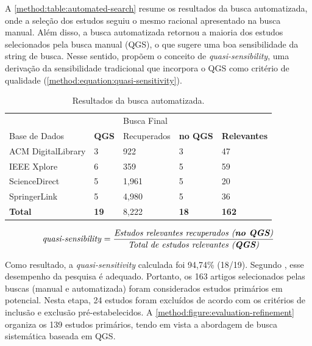 A \autoref{method:table:automated-search} resume os resultados da busca automatizada, onde a seleção dos estudos seguiu o mesmo racional apresentado na busca manual. Além disso, a busca automatizada retornou a maioria dos estudos selecionados pela busca manual (QGS), o que sugere uma boa sensibilidade da string de busca. Nesse sentido,  propõem o conceito de \textit{quasi-sensibility}, uma derivação da sensibilidade tradicional que incorpora o QGS como critério de qualidade (\autoref{method:equation:quasi-sensitivity}).

\begin{table}[htbp]
\centering
\caption{Resultados da busca automatizada.}
\label{method:table:automated-search}
\begin{tabular}{lllll}
\hline
 &  & Busca Final &                 &                   \\ \cline{3-5} 
Base de Dados & \textbf{QGS} & Recuperados    & \textbf{no QGS} & \textbf{Relevantes} \\ \hline
ACM DigitalLibrary & 3            & 922          & 3               & 47                \\
IEEE Xplore        & 6            & 359          & 5               & 59                \\
ScienceDirect      & 5            & 1,961        & 5               & 20                \\
SpringerLink       & 5            & 4,980        & 5               & 36                \\
\textbf{Total}   & \textbf{19}  & 8,222        & \textbf{18}     & \textbf{162}      \\ \hline
\end{tabular}
\end{table}

\begin{equation}
\label{method:equation:quasi-sensitivity}
\text{\textit{quasi-sensibility}} = \frac{\text{\textit{Estudos relevantes recuperados (\textbf{no QGS})}}}{\text{\textit{Total de estudos relevantes (\textbf{QGS})}}}
\end{equation}

Como resultado, a \textit{quasi-sensitivity} calculada foi 94,74\% (18/19). Segundo , esse desempenho da pesquisa é adequado. Portanto, os 163 artigos selecionados pelas buscas (manual e automatizada) foram considerados estudos primários em potencial. Nesta etapa, 24 estudos foram excluídos de acordo com os critérios de inclusão e exclusão pré-estabelecidos. A \autoref{method:figure:evaluation-refinement} organiza os 139 estudos primários, tendo em vista a abordagem de busca sistemática baseada em QGS.

